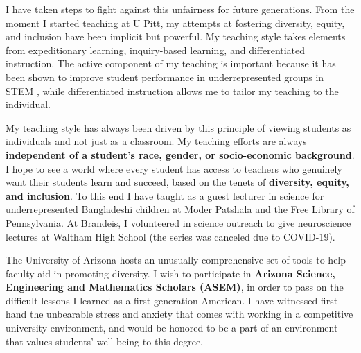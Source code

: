 \documentclass[a4paper,11pt]{article}
\begin{document}
I have taken steps to fight against this unfairness for future generations. From the moment I started teaching at U Pitt, my attempts at fostering diversity, equity, and inclusion have been implicit but powerful. My teaching style takes elements from expeditionary learning, inquiry-based learning, and differentiated instruction. The active component of my teaching is important because it has been shown to improve student performance in underrepresented groups in STEM \cite{theobald2020active}, while differentiated instruction allows me to tailor my teaching to the individual.

My teaching style has always been driven by this principle of viewing students as individuals and not just as a classroom. My teaching efforts are always \textbf{independent of a student's race, gender, or socio-economic background}. I hope to see a world where every student has access to teachers who genuinely want their students learn and succeed, based on the tenets of \textbf{diversity, equity, and inclusion}. To this end I have taught as a guest lecturer in science for underrepresented Bangladeshi children at Moder Patshala and the Free Library of Pennsylvania. At Brandeis, I volunteered in science outreach to give neuroscience lectures at Waltham High School (the series was canceled due to COVID-19).

The University of Arizona hosts an unusually comprehensive set of tools to help faculty aid in promoting diversity. I wish to participate in \textbf{Arizona Science, Engineering and Mathematics Scholars (ASEM)}, in order to pass on the difficult lessons I learned as a first-generation American. I have witnessed first-hand the unbearable stress and anxiety that comes with working in a competitive university environment, and would be honored to be a part of an environment that values students' well-being to this degree.
\end{document}
